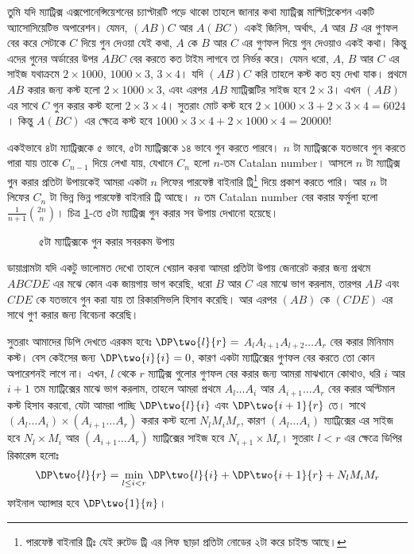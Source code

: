 \begin{solution}
  তুমি যদি ম্যাট্রিক্স এক্সপোনেন্সিয়েশনের চ্যাপ্টারটি পড়ে থাকো তাহলে জানার
  কথা ম্যাট্রিক্স মাল্টিপ্লিকেশন একটি অ্যাসোসিয়েটিভ অপারেশন। যেমন, $(AB)C$ আর
  $A(BC)$ একই জিনিস, অর্থাৎ, $A$ আর $B$ এর গুণফল বের করে সেটাকে $C$ দিয়ে গুন
  দেওয়া যেই কথা, $A$ কে $B$ আর $C$ এর গুণফল দিয়ে গুন দেওয়াও একই কথা। কিন্তু
  এদের গুনের অর্ডারের উপর $ABC$ বের করতে কত টাইম লাগবে তা নির্ভর করে। যেমন
  ধরো, $A$, $B$ আর $C$ এর সাইজ যথাক্রমে $2 \times 1000$, $1000 \times 3$, $3
  \times 4$। যদি $(AB)C$ করি তাহলে কস্ট কত হয় দেখা যাক। প্রথমে $AB$
  করার জন্য কস্ট হলো $2 \times 1000 \times 3$, এবং এরপর $AB$ ম্যাট্রিক্সটির
  সাইজ হবে $2 \times 3$। এখন $(AB)$ এর সাথে $C$ গুন করার কস্ট হলো $2 \times 3
  \times 4$। সুতরাং মোট কস্ট হবে $2 \times 1000 \times 3 + 2 \times 3
  \times 4 = 6024$। কিন্তু $A(BC)$ এর ক্ষেত্রে কস্ট হবে $1000 \times 3 \times
  4 + 2 \times 1000 \times 4 = 20000$!

  একইভাবে ৪টা ম্যাট্রিক্সকে ৫ ভাবে, ৫টা ম্যাট্রিক্সকে ১৪ ভাবে গুন করতে পারবে।
  $n$ টা ম্যাট্রিক্সকে যতভাবে গুন করতে পারা যায় তাকে $C_{n-1}$ দিয়ে লেখা যায়,
  যেখানে $C_n$ হলো $n$-তম Catalan number। আসলে $n$ টা ম্যাট্রিক্স গুন করার
  প্রতিটা উপায়কেই আমরা একটা $n$ লিফের পারফেক্ট বাইনারি ট্রি\footnote{পারফেক্ট
  বাইনারি ট্রিঃ যেই রুটেড ট্রি এর লিফ ছাড়া প্রতিটা নোডের ২টা করে চাইল্ড আছে।
  } দিয়ে প্রকাশ করতে পারি। আর $n$ টা লিফের $C_n$ টা ভিন্ন ভিন্ন পারফেক্ট
  বাইনারি ট্রি আছে। $n$ তম Catalan number বের করার ফর্মুলা হলো $\frac{1}{n+1}
  \binom{2n}{n}$। চিত্র \ref{perfect_binary_trees_with_5_leaves}-তে ৫টা
  ম্যাট্রিক্স গুন করার সব উপায় দেখানো হয়েছে।
  \begin{figure}
    \centering
    
    \caption{৫টা ম্যাট্রিক্সকে গুন করার সবরকম উপায়}
    \label{perfect_binary_trees_with_5_leaves}
  \end{figure}

  ডায়াগ্রামটা যদি একটু ভালোমত দেখো তাহলে খেয়াল করবা আমরা প্রতিটা উপায় জেনারেট
  করার জন্য প্রথমে $ABCDE$ এর মঝে কোন এক জায়গায় ভাগ করেছি, ধরো $B$ আর $C$ এর
  মাঝে ভাগ করলাম, তারপর $AB$ এবং $CDE$ কে যতভাবে গুন করা যায় তা রিকারসিভলি
  হিসাব করেছি। আর এরপর $(AB)$ কে $(CDE)$ এর সাথে গুণ করার জন্য বিবেচনা করেছি।

  সুতরাং আমাদের ডিপি দেখতে এরকম হবেঃ $\DP \two{l}{r} = $ $A_l A_{l+1} A_{l+2}
  \dots A_{r}$ বের করার মিনিমাম কস্ট। বেস কেইসের জন্য $\DP \two{i}{i} = 0$,
  কারণ একটা ম্যাট্রিক্সের গুণফল বের করতে তো কোন অপারেশনই লাগে না। এখন, $l$
  থেকে $r$ ম্যাট্রিক্স গুলোর গুণফল বের করার জন্য আমরা মাঝখানে কোথাও, ধরি $i$
  আর $i+1$ তম ম্যাট্রিক্সের মাঝে ভাগ করলাম, তাহলে আমরা প্রথমে $A_l \dots A_i$
  আর $A_{i+1} \dots A_{r}$ বের করার অপ্টিমাল কস্ট হিসাব করবো, যেটা আমরা
  পাচ্ছি $\DP\two{l}{i}$ এবং $\DP\two{i+1}{r}$ তে। সাথে $(A_l \dots A_{i})
  \times (A_{i+1} \dots A_{r})$ করার কস্ট হলো $N_l M_i M_r$, কারণ $(A_l \dots
  A_{i})$ ম্যাট্রিক্সের এর সাইজ হবে $N_l \times M_i$ আর $(A_{i+1} \dots A_r)$
  ম্যাট্রিক্সের সাইজ হবে $N_{i+1} \times M_r$। সুতরাং $l < r$ এর ক্ষেত্রে
  ডিপির রিকারেন্স হলোঃ
  \[
    \DP\two{l}{r} = \min_{l \le i < r} \DP\two{l}{i} + \DP\two{i+1}{r} + N_l
    M_i M_r
  \]
  ফাইনাল অ্যান্সার হবে $\DP\two{1}{n}$।
\end{solution}

